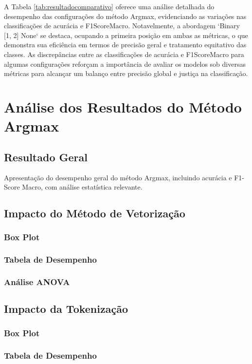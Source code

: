 A Tabela \ref{tab:resultadocomparativo} oferece uma análise detalhada do desempenho das configurações do método Argmax, evidenciando as variações nas classificações de acurácia e F1ScoreMacro. Notavelmente, a abordagem `Binary [1, 2] None` se destaca, ocupando a primeira posição em ambas as métricas, o que demonstra sua eficiência em termos de precisão geral e tratamento equitativo das classes. As discrepâncias entre as classificações de acurácia e F1ScoreMacro para algumas configurações reforçam a importância de avaliar os modelos sob diversas métricas para alcançar um balanço entre precisão global e justiça na classificação.



\section{Análise dos Resultados do Método Argmax}
\subsection{Resultado Geral}
Apresentação do desempenho geral do método Argmax, incluindo acurácia e F1-Score Macro, com análise estatística relevante.

\subsection{Impacto do Método de Vetorização}
\subsubsection{Box Plot}
\subsubsection{Tabela de Desempenho}
\subsubsection{Análise ANOVA}

\subsection{Impacto da Tokenização}
\subsubsection{Box Plot}
\subsubsection{Tabela de Desempenho}
